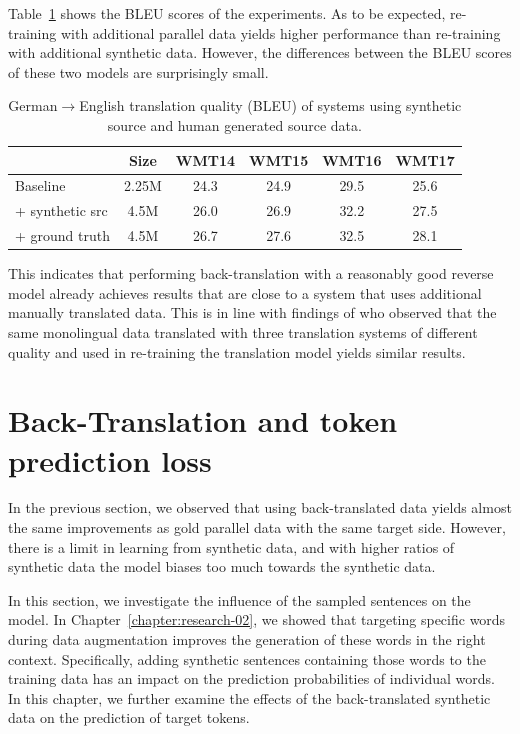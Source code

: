 Table~\ref{groundt} shows the {BLEU} scores of the experiments.
As to be expected, re-training with additional parallel data yields higher performance than re-training with additional synthetic data.
However, the differences between the {BLEU} scores of these two models are surprisingly small.
%
%
\begin{table}[htb!]
\begin{center}
\caption{\label{groundt} German$\rightarrow$English translation quality ({BLEU}) of systems using synthetic source and human generated source data.}
\begin{tabular}{lccccc}
 \toprule \bf  & \bf  Size  &  \bf WMT14 &  \bf	WMT15 &  \bf	WMT16 &  \bf	WMT17 \\ \midrule%
Baseline  &	2.25M	&24.3	&24.9	&29.5	&25.6\\
\hspace{.15cm} + synthetic src &	4.5M	 &26.0	&26.9	&32.2	&27.5\\
\hspace{.15cm} + ground truth	& 4.5M	& 26.7	&27.6	&32.5	&28.1\\
\bottomrule
\end{tabular}
\end{center}
\end{table}
%
This indicates that performing back-translation with a reasonably good reverse model already achieves results that are close to a system that uses additional manually translated data.
This is in line with findings of \citet{sennrich-haddow-birch:2016:P16-11} who observed that the same monolingual data translated with three translation systems of different quality and used in re-training the translation model yields similar results. 


\section{Back-Translation and token prediction loss} \label{bttokpred}

In the previous section, we observed that using back-translated data yields almost the same improvements as gold parallel data with the same target side.
However, there is a limit in learning from synthetic data, and with higher ratios of synthetic data the model biases too much towards the synthetic data.

In this section, we investigate the influence of the sampled sentences on the model.
In Chapter~\ref{chapter:research-02}, we showed that targeting specific words during data augmentation improves the generation of these words in the right context. 
Specifically, adding synthetic sentences containing those words to the training data has an impact on the prediction probabilities of individual words.
In this chapter, we further examine the effects of the back-translated synthetic data on the prediction of target tokens.

